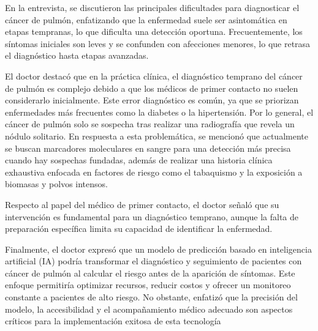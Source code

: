 En la entrevista, se discutieron las principales dificultades para diagnosticar el cáncer de pulmón, enfatizando que la enfermedad suele ser asintomática en etapas tempranas, lo que dificulta una detección oportuna. Frecuentemente, los síntomas iniciales son leves y se confunden con afecciones menores, lo que retrasa el diagnóstico hasta etapas avanzadas.

El doctor destacó que en la práctica clínica, el diagnóstico temprano del cáncer de pulmón es complejo debido a que los médicos de primer contacto no suelen considerarlo inicialmente. Este error diagnóstico es común, ya que se priorizan enfermedades más frecuentes como la diabetes o la hipertensión. Por lo general, el cáncer de pulmón solo se sospecha tras realizar una radiografía que revela un nódulo solitario. En respuesta a esta problemática, se mencionó que actualmente se buscan marcadores moleculares en sangre para una detección más precisa cuando hay sospechas fundadas, además de realizar una historia clínica exhaustiva enfocada en factores de riesgo como el tabaquismo y la exposición a biomasas y polvos intensos.

Respecto al papel del médico de primer contacto, el doctor señaló que su intervención es fundamental para un diagnóstico temprano, aunque la falta de preparación específica limita su capacidad de identificar la enfermedad.

Finalmente, el doctor expresó que un modelo de predicción basado en inteligencia artificial (IA) podría transformar el diagnóstico y seguimiento de pacientes con cáncer de pulmón al calcular el riesgo antes de la aparición de síntomas. Este enfoque permitiría optimizar recursos, reducir costos y ofrecer un monitoreo constante a pacientes de alto riesgo. No obstante, enfatizó que la precisión del modelo, la accesibilidad y el acompañamiento médico adecuado son aspectos críticos para la implementación exitosa de esta tecnología



\newpage



\newpage